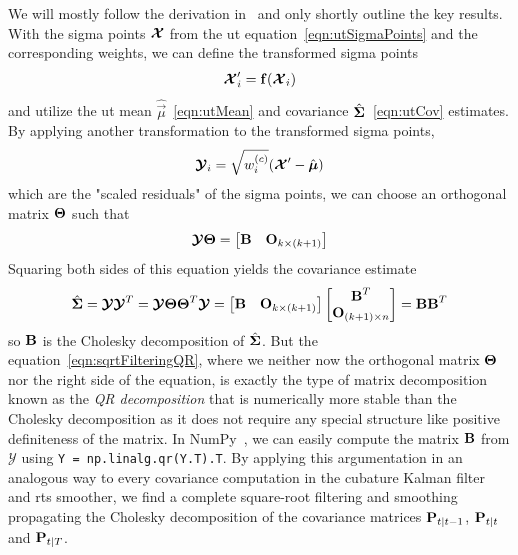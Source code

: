 		We will mostly follow the derivation in~\cite{ruttenSquarerootUnscentedFiltering2013} and only shortly outline the key results. With the sigma points \( \boldsymbol{\mathrm{\mathcal{X}}} \) from the \ac{ut} equation~\eqref{eqn:utSigmaPoints} and the corresponding weights, we can define the transformed sigma points
		\begin{equation*}
			\boldsymbol{\mathrm{\mathcal{X}}}_i' = \boldsymbol{\mathrm{f}}(\boldsymbol{\mathrm{\mathcal{X}}}_i)
		\end{equation*}
		and utilize the \ac{ut} mean \( \hat{\vec{\mu}} \)~\eqref{eqn:utMean} and covariance \( \hat{\boldsymbol{\mathrm{\Sigma}}} \)~\eqref{eqn:utCov} estimates. By applying another transformation to the transformed sigma points,
		\begin{equation*}
			\boldsymbol{\mathrm{\mathcal{Y}}}_i = \sqrt{w_i^{(c)}} (\boldsymbol{\mathrm{\mathcal{X}}}' - \hat{\boldsymbol{\mathrm{\mu}}})
		\end{equation*}
		which are the "scaled residuals" of the sigma points, we can choose an orthogonal matrix \( \boldsymbol{\mathrm{\Theta}} \) such that
		\begin{equation}
			\boldsymbol{\mathrm{\mathcal{Y}}} \boldsymbol{\mathrm{\Theta}} = \begin{bmatrix} \boldsymbol{\mathrm{B}} & \boldsymbol{\mathrm{O}}_{k \times (k + 1)} \end{bmatrix}  \label{eqn:sqrtFilteringQR}
		\end{equation}
		Squaring both sides of this equation yields the covariance estimate
		\begin{equation*}
			\hat{\boldsymbol{\mathrm{\Sigma}}} = \boldsymbol{\mathrm{\mathcal{Y}}} \boldsymbol{\mathrm{\mathcal{Y}}}^T = \boldsymbol{\mathrm{\mathcal{Y}}} \boldsymbol{\mathrm{\Theta}} \boldsymbol{\mathrm{\Theta}}^T \boldsymbol{\mathrm{\mathcal{Y}}} = \begin{bmatrix} \boldsymbol{\mathrm{B}} & \boldsymbol{\mathrm{O}}_{k \times (k + 1)} \end{bmatrix} \begin{bmatrix} \boldsymbol{\mathrm{B}}^T \\ \boldsymbol{\mathrm{O}}_{(k + 1) \times n} \end{bmatrix} = \boldsymbol{\mathrm{B}} \boldsymbol{\mathrm{B}}^T
		\end{equation*}
		so \( \boldsymbol{\mathrm{B}} \) is the Cholesky decomposition of \( \hat{\boldsymbol{\mathrm{\Sigma}}} \). But the equation~\eqref{eqn:sqrtFilteringQR}, where we neither now the orthogonal matrix \( \boldsymbol{\mathrm{\Theta}} \) nor the right side of the equation, is exactly the type of matrix decomposition known as the \emph{QR decomposition} that is numerically more stable than the Cholesky decomposition as it does not require any special structure like positive definiteness of the matrix.  In NumPy~\cite{harrisArrayProgrammingNumPy2020}, we can easily compute the matrix \( \boldsymbol{\mathrm{B}} \) from \( \mathbb{\mathcal{Y}} \) using \lstinline|Y = np.linalg.qr(Y.T).T|. By applying this argumentation in an analogous way to every covariance computation in the cubature Kalman filter and \ac{rts} smoother, we find a complete square-root filtering and smoothing propagating the Cholesky decomposition of the covariance matrices \( \boldsymbol{\mathrm{P}}_{t \vert t - 1} \), \( \boldsymbol{\mathrm{P}}_{t \vert t} \) and \( \boldsymbol{\mathrm{P}}_{t \vert T} \).

